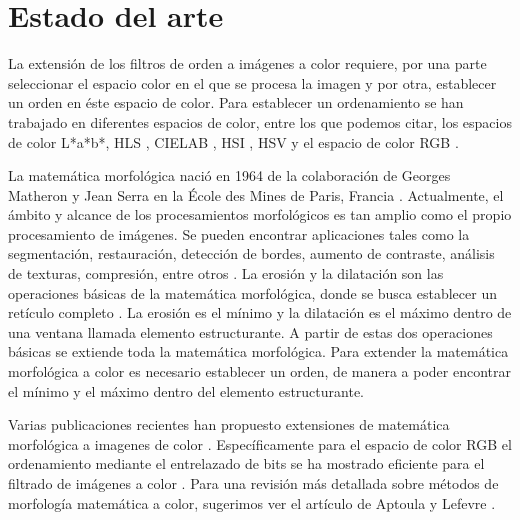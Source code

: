 \section{Estado del arte}
\label{Relacionados}

La extensi\'on de los filtros de orden a im\'agenes a color requiere, por una parte seleccionar el espacio color en el que se procesa la imagen y por otra, establecer un orden en \'este espacio de color. Para establecer un ordenamiento se han trabajado en diferentes espacios de color, entre los que podemos citar, los espacios de color L*a*b*\cite{hanbury2001mathematical}, HLS \cite{hanbury2001mathematical2},  CIELAB \cite{hanbury2002mathematical3}, HSI \cite{tobar2007mathematical}, HSV \cite{lei2013vector} y el espacio de color RGB  \cite{zaharescu2003color, gao2013adaptive, wang2012edge}.


La matemática morfológica nació en 1964 de la colaboración de Georges Matheron y Jean Serra en la École des Mines de Paris, Francia \cite{serra1982image}. Actualmente, el ámbito y alcance de los procesamientos morfológicos es tan amplio como el propio procesamiento de imágenes. Se pueden encontrar aplicaciones tales como la segmentación, restauración, detección de bordes, aumento de contraste, análisis de texturas, compresión, entre otros \cite{ortiz2002procesamiento}. 
La erosi\'on y la dilataci\'on son las operaciones b\'asicas de la matem\'atica morfol\'ogica, donde se busca establecer un ret\'iculo completo \cite{heijmans1990algebraic}. La erosi\'on es el m\'inimo y la dilataci\'on es el m\'aximo dentro de una ventana llamada elemento estructurante. A partir de estas dos operaciones b\'asicas se extiende toda la matem\'atica morfol\'ogica.  Para extender la matem\'atica morfol\'ogica a color es necesario establecer un orden, de manera a poder encontrar el m\'inimo y el m\'aximo dentro del elemento estructurante. 


Varias publicaciones recientes han propuesto extensiones de matemática morfológica a imagenes de color \cite{ledoux2012limits, van2013group, velasco2012random, lezoray2009learning, velasco2010morphological, burgeth2013morphology, velasco2011supervised, hanbury2001morphological, angulo2010pseudo, aptoula2008alpha, kleefeld2015processing, vazquez2014color}. Espec\'ificamente para el espacio de color RGB el ordenamiento mediante el entrelazado de bits se ha mostrado eficiente para el filtrado de im\'agenes a color \cite{chanussot1997bit}. Para una revisión más detallada sobre métodos de morfología matemática a color, sugerimos ver el artículo de Aptoula y Lefevre \cite{aptoula2007comparative}.

